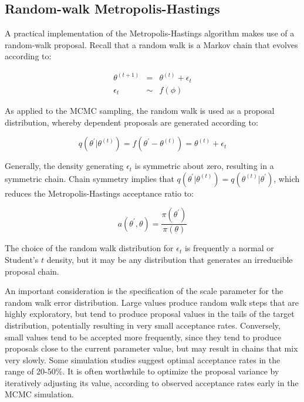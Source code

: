 
\hypertarget{random-walk-metropolis-hastings}{}
\subsection*{Random-walk Metropolis-Hastings}

A practical implementation of the Metropolis-Hastings algorithm makes use of a random-walk proposal. Recall that a random walk is a Markov chain that evolves according to:

\begin{eqnarray*}
\theta^{(t+1)} &=& \theta^{(t)} + \epsilon_t \\
\epsilon_t &\sim& f(\phi)
\end{eqnarray*}

As applied to the MCMC sampling, the random walk is used as a proposal distribution, whereby dependent proposals are generated according to:

\[
q(\theta^{\prime} | \theta^{(t)}) = f(\theta^{\prime} - \theta^{(t)}) = \theta^{(t)} + \epsilon_t
\]

Generally, the density generating $\epsilon_t$ is symmetric about zero, resulting in a symmetric chain. Chain symmetry implies that $q(\theta^{\prime} | \theta^{(t)}) = q(\theta^{(t)} | \theta^{\prime})$, which reduces the Metropolis-Hastings acceptance ratio to:

\[
a(\theta^{\prime},\theta) = \frac{\pi(\theta^{\prime})}{\pi(\theta)}
\]

The choice of the random walk distribution for $\epsilon_t$ is frequently a normal or Student's $t$ density, but it may be any distribution that generates an irreducible proposal chain.

An important consideration is the specification of the scale parameter for the random walk error distribution. Large values produce random walk steps that are highly exploratory, but tend to produce proposal values in the tails of the target distribution, potentially resulting in very small acceptance rates. Conversely, small values tend to be accepted more frequently, since they tend to produce proposals close to the current parameter value, but may result in chains that mix very slowly. Some simulation studies suggest optimal acceptance rates in the range of 20-50\%. It is often worthwhile to optimize the proposal variance by iteratively adjusting its value, according to observed acceptance rates early in the MCMC simulation.
